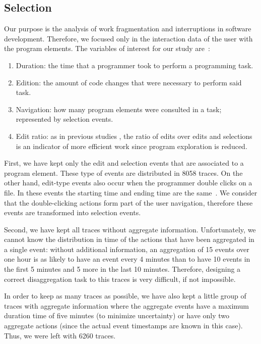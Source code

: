 \documentclass[conference]{IEEEtran}
\begin{document}
\subsection{Selection}
Our purpose is the analysis of work fragmentation and interruptions in software development. Therefore, we focused only in the interaction data of the user with the program elements. The  variables of interest for our study are~\cite{RD13}:
\begin{enumerate}
\item Duration: the time that a programmer took to perform a programming task. 
\item Edition:  the amount of code changes that were necessary to perform said task. %
\item Navigation: how many program elements were consulted in a task; represented by selection events.
\item Edit ratio: as in previous studies \cite{KM06}, the ratio of edits over edits and selections is an indicator of more efficient work since program exploration is reduced.
\end{enumerate}

First, we have kept only the edit and selection events that are associated to a program element. These type of events are distributed in 8058 traces. On the other hand, edit-type events also occur when the programmer double clicks on a file. In these events the starting time and ending time are the same~\cite{LJD11}. We consider that the double-clicking actions form part of the user navigation, therefore these events are transformed into selection events.  

Second, we have kept all traces without aggregate information. Unfortunately, we cannot know the distribution in time of the actions that have been aggregated in a single event: without additional information, an aggregation of 15 events over one hour is as likely to have an event every 4 minutes than to have 10 events in the first 5 minutes and 5 more in the last 10 minutes. Therefore, designing a correct disaggregation task to this traces is very difficult, if not impossible.

In order to keep as many traces as possible, we have also kept a little group of traces with aggregate information where the aggregate events have a maximum duration time of five minutes (to minimize uncertainty) or have only two aggregate actions (since the actual event timestamps are known in this case). Thus, we were left with 6260 traces.
\end{document}
